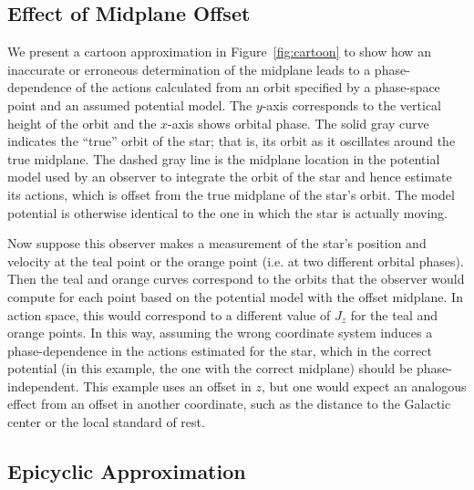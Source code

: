 \documentclass[twocolumn]{aastex62}
\begin{document}
\subsection{Effect of Midplane Offset} \label{ssec:cartoon}
We present a cartoon approximation in Figure~\ref{fig:cartoon} to show how an
inaccurate or erroneous determination of the midplane leads to a phase-dependence of the actions
calculated from an orbit specified by a phase-space point and an assumed
potential model. The $y$-axis corresponds to the vertical height of the orbit
and the $x$-axis shows orbital phase. The solid gray curve indicates the
``true'' orbit of the star; that is, its orbit as it oscillates around the
true midplane. The dashed gray line is the midplane location in the potential
model used by an observer to integrate the orbit of the star and hence
estimate its actions, which is offset from the true midplane of the star's
orbit. The model potential is otherwise identical to the one in which the star
is actually moving.

Now suppose this observer makes a measurement of the star's position and
velocity at the teal point or the orange point (i.e. at two different orbital
phases). Then the teal and orange curves correspond to the orbits that the
observer would compute for each point based on the potential model with the
offset midplane. In action space, this would correspond to a different value
of $J_z$ for the teal and orange points. In this way, assuming the wrong
coordinate system induces a phase-dependence in the actions estimated for the
star, which in the correct potential (in this example, the one with the
correct midplane) should be phase-independent. This example uses an offset in $z$, but one would expect an analogous effect from an offset in another coordinate, such as the distance to the Galactic center or the local standard of rest.

\subsection{Epicyclic Approximation} \label{ssec:epi_action}
\end{document}
